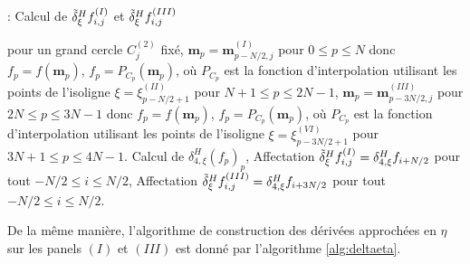 \begin{center}
\begin{minipage}[H]{12cm}
  \begin{algorithm}[H]
    \caption{: Calcul de $\tilde{\delta}^H_{\xi} f_{i, j}^{(I)}$ et $\tilde{\delta}^H_{\xi} f_{i, j}^{(III)}$}\label{alg:deltaxi}
    \begin{algorithmic}[1]
    \State pour un grand cercle $C_j^{(2)}$ fixé,
             \State  $\mathbf{m}_p = \mathbf{m}_{p-N/2,j}^{(I)}$ pour $0  \leq p \leq N$ donc $f_p = f(\mathbf{m}_p)$,
             \State $f_p = P_{C_p}(\mathbf{m}_p)$, où $P_{C_p}$ est la fonction d'interpolation utilisant les points de l'isoligne $\xi = \xi^{(II)}_{p-N/2+1}$ pour $N+1 \leq p \leq 2N-1$,
             \State  $\mathbf{m}_p = \mathbf{m}_{p-3N/2,j}^{(III)}$ pour $2N  \leq p \leq 3N-1$ donc $f_p = f(\mathbf{m}_p)$,
             \State $f_p = P_{C_p}(\mathbf{m}_p)$, où $P_{C_p}$ est la fonction d'interpolation utilisant les points de l'isoligne $\xi = \xi^{(VI)}_{p-3N/2+1}$ pour $3N+1 \leq p \leq 4N-1$.
            \EndFor
    \State Calcul de $\delta_{4, \xi}^H (f_p)_p$,
    \State Affectation $\tilde{\delta}^H_{\xi} f_{i,j}^{(I)} = \delta_{4, \xi}^H f_{i+N/2}$ pour tout $-N/2 \leq i \leq N/2$,
    \State Affectation $\tilde{\delta}^H_{\xi} f_{i,j}^{(III)} = \delta_{4, \xi}^H f_{i+3N/2}$ pour tout $-N/2 \leq i \leq N/2$.
    \EndFor
    \end{algorithmic}
    \end{algorithm}
\end{minipage}
\end{center}
De la même manière, l'algorithme de construction des dérivées approchées en $\eta$ sur les panels $(I)$ et $(III)$ est donné par l'algorithme \ref{alg:deltaeta}.
